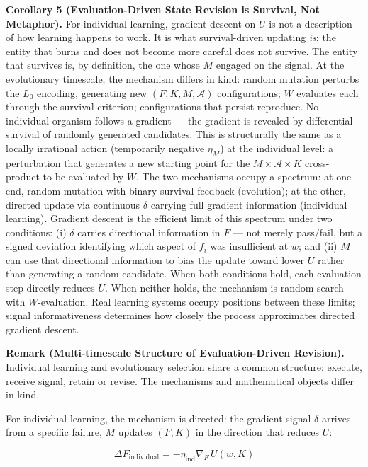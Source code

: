 \documentclass[
]{article}
\begin{document}
\textbf{Corollary 5 (Evaluation-Driven State Revision is Survival, Not
Metaphor).} For individual learning, gradient descent on \(U\) is not a
description of how learning happens to work. It is what survival-driven
updating \emph{is}: the entity that burns and does not become more
careful does not survive. The entity that survives is, by definition,
the one whose \(M\) engaged on the signal. At the evolutionary
timescale, the mechanism differs in kind: random mutation perturbs the
\(L_0\) encoding, generating new \((F, K, M, \mathcal{A})\)
configurations; \(W\) evaluates each through the survival criterion;
configurations that persist reproduce. No individual organism follows a
gradient --- the gradient is revealed by differential survival of
randomly generated candidates. This is structurally the same as a
locally irrational action (temporarily negative \(\eta_M\)) at the
individual level: a perturbation that generates a new starting point for
the \(M \times \mathcal{A} \times K\) cross-product to be evaluated by
\(W\). The two mechanisms occupy a spectrum: at one end, random mutation
with binary survival feedback (evolution); at the other, directed update
via continuous \(\delta\) carrying full gradient information (individual
learning). Gradient descent is the efficient limit of this spectrum
under two conditions: (i) \(\delta\) carries directional information in
\(F\) --- not merely pass/fail, but a signed deviation identifying which
aspect of \(f_i\) was insufficient at \(w\); and (ii) \(M\) can use that
directional information to bias the update toward lower \(U\) rather
than generating a random candidate. When both conditions hold, each
evaluation step directly reduces \(U\). When neither holds, the
mechanism is random search with \(W\)-evaluation. Real learning systems
occupy positions between these limits; signal informativeness determines
how closely the process approximates directed gradient descent.

\textbf{Remark (Multi-timescale Structure of Evaluation-Driven
Revision).} Individual learning and evolutionary selection share a
common structure: execute, receive signal, retain or revise. The
mechanisms and mathematical objects differ in kind.

For individual learning, the mechanism is directed: the gradient signal
\(\delta\) arrives from a specific failure, \(M\) updates \((F, K)\) in
the direction that reduces \(U\):

\[\Delta F_{\text{individual}} = -\eta_{\text{ind}} \nabla_F \, U(w, K)\]
\end{document}

